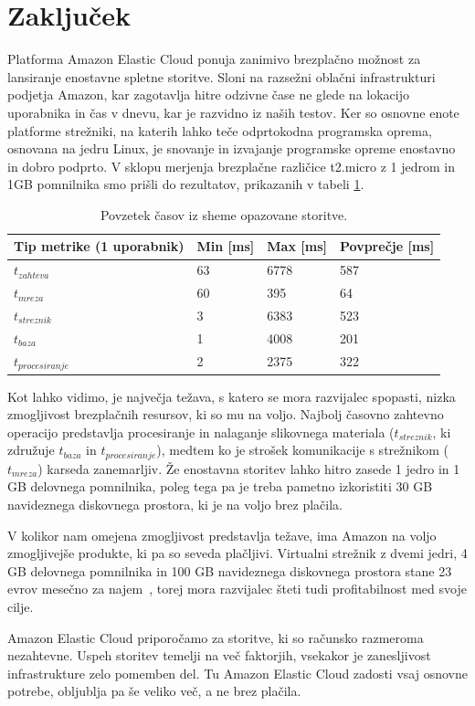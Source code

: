 \section{Zaključek}

Platforma Amazon Elastic Cloud ponuja zanimivo brezplačno možnost za lansiranje enostavne spletne storitve.
Sloni na razsežni oblačni infrastrukturi podjetja Amazon, kar zagotavlja hitre odzivne čase ne glede na lokacijo uporabnika in čas v dnevu, kar je razvidno iz naših testov. Ker so osnovne enote platforme strežniki, na katerih lahko teče odprtokodna programska oprema, osnovana na jedru Linux, je snovanje in izvajanje programske opreme enostavno in dobro podprto. V sklopu merjenja brezplačne različice t2.micro z 1 jedrom in 1GB pomnilnika smo prišli do rezultatov, prikazanih v tabeli \ref{1_tab_summary}.

\begin{table}[ht]
 \caption{Povzetek časov iz sheme opazovane storitve.}
 \label{1_tab_summary}
 \centering
\begin{tabular}{ |p{4.0cm}||p{2.0cm}|p{2.0cm}|p{2.0cm}| }
 \hline
 Tip metrike (1 uporabnik) & Min [ms] & Max [ms] & Povprečje [ms] \\
 \hline
 $t_{zahteva}$                   & 63 & 6778 & 587 \\
 \hspace{2mm}$t_{mreza}$         & 60 &  395 &  64 \\
 \hspace{2mm}$t_{streznik}$      &  3 & 6383 & 523 \\
 \hspace{4mm}$t_{baza}$          &  1 & 4008 & 201 \\
 \hspace{4mm}$t_{procesiranje}$  &  2 & 2375 & 322 \\
 \hline
\end{tabular}
\end{table}

Kot lahko vidimo, je največja težava, s katero se mora razvijalec spopasti, nizka zmogljivost brezplačnih resursov, ki so mu na voljo. Najbolj časovno zahtevno operacijo predstavlja procesiranje in nalaganje slikovnega materiala ($t_{streznik}$, ki združuje $t_{baza}$ in $t_{procesiranje}$), medtem ko je strošek komunikacije s strežnikom ($t_{mreza}$) karseda zanemarljiv.
Že enostavna storitev lahko hitro zasede 1 jedro in 1 GB delovnega pomnilnika, poleg tega pa je treba pametno izkoristiti 30 GB navideznega diskovnega prostora, ki je na voljo brez plačila.

V kolikor nam omejena zmogljivost predstavlja težave, ima Amazon na voljo zmogljivejše produkte, ki pa so seveda plačljivi.
Virtualni strežnik z dvemi jedri, 4 GB delovnega pomnilnika in 100 GB navideznega diskovnega prostora stane 23 evrov mesečno za najem~\cite{1_aws_pricing}, torej mora razvijalec šteti tudi profitabilnost med svoje cilje.

Amazon Elastic Cloud priporočamo za storitve, ki so računsko razmeroma nezahtevne.
Uspeh storitev temelji na več faktorjih, vsekakor je zanesljivost infrastrukture zelo pomemben del.
Tu Amazon Elastic Cloud zadosti vsaj osnovne potrebe, obljublja pa še veliko več, a ne brez plačila.

